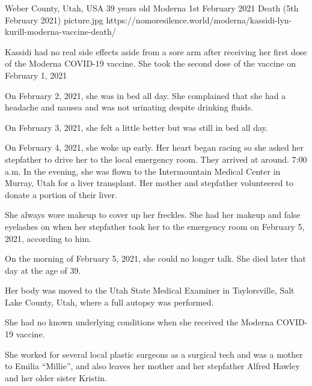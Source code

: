{Weber County, Utah, USA}
{39 years old}
{Moderna}
{1st February 2021}
{Death (5th February 2021)}
{picture.jpg}
{https://nomoresilence.world/moderna/kassidi-lyn-kurill-moderna-vaccine-death/}
{

Kassidi had no real side effects aside from a sore arm after receiving her first
dose of the Moderna COVID-19 vaccine. She took the second dose of the vaccine on
February 1, 2021

On February 2, 2021, she was in bed all day. She complained that she had a
headache and nausea and was not urinating despite drinking fluids.

On February 3, 2021, she felt a little better but was still in bed all day.

On February 4, 2021, she woke up early. Her heart began racing so she asked her
stepfather to drive her to the local emergency room. They arrived at
around. 7:00 a.m. In the evening, she was flown to the Intermountain Medical
Center in Murray, Utah for a liver transplant. Her mother and stepfather
volunteered to donate a portion of their liver.

She always wore makeup to cover up her freckles. She had her makeup and false
eyelashes on when her stepfather took her to the emergency room on February 5,
2021, according to him.

On the morning of February 5, 2021, she could no longer talk. She died later
that day at the age of 39.

Her body was moved to the Utah State Medical Examiner in Taylorsville, Salt Lake
County, Utah, where a full autopsy was performed.

She had no known underlying conditions when she received the Moderna COVID-19
vaccine.

She worked for several local plastic surgeons as a surgical tech and was a
mother to Emilia “Millie”, and also leaves her mother and her stepfather Alfred
Hawley and her older sister Kristin.

}

